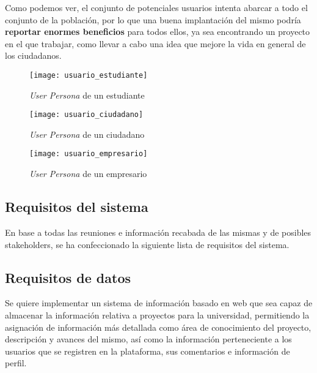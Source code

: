 Como podemos ver, el conjunto de potenciales usuarios intenta abarcar a todo el conjunto de la población, por lo que una buena implantación del mismo podría \textbf{reportar enormes beneficios} para todos ellos, ya sea encontrando un proyecto en el que trabajar, como llevar a cabo una idea que mejore la vida en general de los ciudadanos.

\begin{figure}
    \centering
    \texttt{[image: usuario\_estudiante]}
    \caption{\textit{User Persona} de un estudiante}
    \label{usuario_estudiante}
\end{figure}

\begin{figure}
    \centering
    \texttt{[image: usuario\_ciudadano]}
    \caption{\textit{User Persona} de un ciudadano}
    \label{usuario_ciudadano}
\end{figure}

\begin{figure}
    \centering
    \texttt{[image: usuario\_empresario]}
    \caption{\textit{User Persona} de un empresario}
    \label{usuario_empresario}
\end{figure}

\subsection{Requisitos del sistema}
En base a todas las reuniones e información recabada de las mismas y de posibles stakeholders, se ha confeccionado la siguiente lista de requisitos del sistema.

\subsection*{Requisitos de datos}
Se quiere implementar un sistema de información basado en web que sea capaz de almacenar la información relativa a proyectos para la universidad, permitiendo la asignación de información más detallada como área de conocimiento del proyecto, descripción y avances del mismo, así como la información perteneciente a los usuarios que se registren en la plataforma, sus comentarios e información de perfil.

